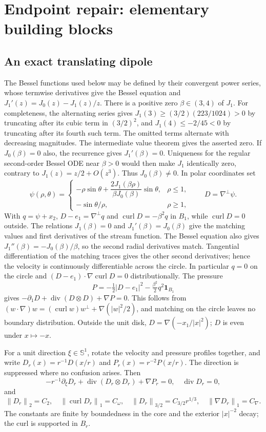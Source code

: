 \documentclass[11pt]{article}
\theoremstyle{remark}\newtheorem{remark}[theorem]{Remark}
\newcommand{\curl}{\operatorname{curl}}
\newcommand{\Div}{\operatorname{div}}
\newcommand{\norm}[2]{\left\|#1\right\|_{#2}}
\begin{document}
\section{Endpoint repair: elementary building blocks}

\subsection{An exact translating dipole}
The Bessel functions used below may be defined by their convergent power
series, whose termwise derivatives give the Bessel equation and
$J_1'(z)=J_0(z)-J_1(z)/z$.
There is a positive zero $\beta\in(3,4)$ of $J_1$.
For completeness, the alternating series gives
$J_1(3)\geq(3/2)(223/1024)>0$ by truncating after its cubic term in
$(3/2)^2$, and $J_1(4)\leq-2/45<0$ by truncating after its fourth such term.
The omitted terms alternate with decreasing magnitudes.
The intermediate value theorem gives the asserted zero.
If $J_0(\beta)=0$ also, the recurrence gives $J_1'(\beta)=0$.
Uniqueness for the regular second-order Bessel ODE near $\beta>0$ would then
make $J_1$ identically zero, contrary to $J_1(z)=z/2+O(z^3)$.
Thus $J_0(\beta)\ne0$.
In polar coordinates set
\[
 \psi(\rho,\theta)=
 \begin{cases}
 -\rho\sin\theta+\dfrac{2J_1(\beta\rho)}{\beta J_0(\beta)}\sin\theta,
 &\rho\leq1,\\
 -\sin\theta/\rho,&\rho\geq1,
 \end{cases}
 \qquad D=\nabla^\perp\psi.
\]
With $q=\psi+x_2$, $D-e_1=\nabla^\perp q$ and
$\curl D=-\beta^2q$ in $B_1$, while $\curl D=0$ outside.
The relations $J_1(\beta)=0$ and $J_1'(\beta)=J_0(\beta)$ give the matching
values and first derivatives of the stream function.
The Bessel equation also gives $J_1''(\beta)=-J_0(\beta)/\beta$,
so the second radial derivatives match.
Tangential differentiation of the matching traces gives the other second
derivatives; hence the velocity is continuously differentiable across the circle.
In particular $q=0$ on
the circle and $(D-e_1)\cdot\nabla\curl D=0$ distributionally. The pressure
\[
 P=-\tfrac12|D-e_1|^2-\tfrac{\beta^2}{2}q^2\mathbf1_{B_1}
\]
gives $-\partial_1D+\Div(D\otimes D)+\nabla P=0$. This follows from
$(w\cdot\nabla)w=(\curl w)w^\perp+\nabla(|w|^2/2)$, and matching on the
circle leaves no boundary distribution. Outside the unit disk,
$D=\nabla(-x_1/|x|^2)$; $D$ is even under $x\mapsto-x$.

For a unit direction $\xi\in\mathbb S^1$, rotate the velocity and pressure profiles together, and write $D_r(x)=r^{-1}D(x/r)$ and $P_r(x)=r^{-2}P(x/r)$.
The direction is suppressed where no confusion arises. Then
\begin{equation}\label{eq:dipole}
 -r^{-1}\partial_\xi D_r+\Div(D_r\otimes D_r)+\nabla P_r=0,
 \quad \Div D_r=0,
\end{equation}
and
\begin{equation}\label{eq:dipole-norms}
 \norm{D_r}2=C_2,\quad \norm{\curl D_r}1=C_\omega,\quad
 \norm{D_r}{3/2}=C_{3/2}r^{1/3},\quad \norm{\nabla D_r}1=C_\nabla.
\end{equation}
The constants are finite by boundedness in the core and the exterior
$|x|^{-2}$ decay; the curl is supported in $B_r$.
\end{document}
